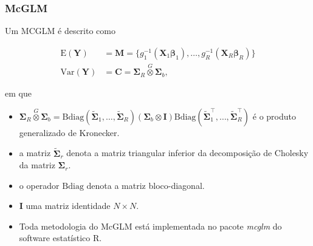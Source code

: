 \documentclass[handout,serif, professionalfont, usenames, dvipsnames, aspectratio = 169]{beamer}\usepackage[]{graphicx}\usepackage[]{color}
\begin{document}
\begin{frame}
  \frametitle{McGLM}
  
  Um MCGLM é descrito como

\begin{equation}
\label{eq:mcglm}
      \begin{aligned}
        \mathrm{E}(\boldsymbol{Y}) &=
          \boldsymbol{M} =
            \{g_1^{-1}(\boldsymbol{X}_1 \boldsymbol{\beta}_1),
            \ldots,
            g_R^{-1}(\boldsymbol{X}_R \boldsymbol{\beta}_R)\}
          \\
        \mathrm{Var}(\boldsymbol{Y}) &=
          \boldsymbol{C} =
            \boldsymbol{\Sigma}_R \overset{G} \otimes
            \boldsymbol{\Sigma}_b,
      \end{aligned}
\end{equation}

em que 
  
  \begin{itemize}
    
    \itemsep 0.5ex
    
  \item $\boldsymbol{\Sigma}_R \overset{G} \otimes \boldsymbol{\Sigma}_b = \mathrm{Bdiag}(\tilde{\boldsymbol{\Sigma}}_1, \ldots, \tilde{\boldsymbol{\Sigma}}_R) (\boldsymbol{\Sigma}_b \otimes \boldsymbol{I}) \mathrm{Bdiag}(\tilde{\boldsymbol{\Sigma}}_1^\top, \ldots, \tilde{\boldsymbol{\Sigma}}_R^\top)$ é o produto generalizado de Kronecker. 
  
  \item a matriz $\tilde{\boldsymbol{\Sigma}}_r$ denota a matriz triangular inferior da decomposição de Cholesky da matriz ${\boldsymbol{\Sigma}}_r$. 
  
  \item o operador $\mathrm{Bdiag}$ denota a matriz bloco-diagonal. 
  
  \item $\boldsymbol{I}$ uma matriz identidade $N \times N$.
  
  \item Toda metodologia do McGLM está implementada no pacote \emph{mcglm} \cite{mcglm} do software estatístico R.

  \end{itemize}
  
\end{frame}

\end{document}
